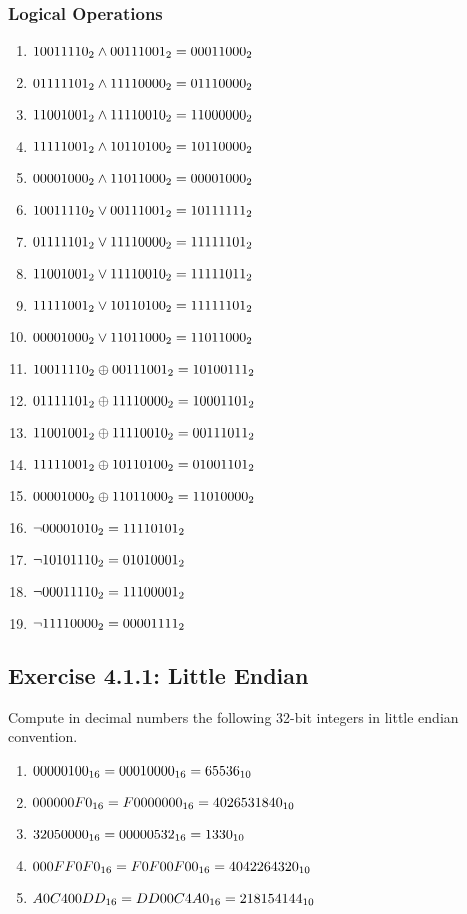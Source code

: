 \documentclass[12pt, a4paper, oneside]{article}
\begin{document}
\subsubsection{Logical Operations}
\begin{enumerate}[$\bullet$]
  \item $1001 1110_{2} \land 0011 1001_{2} \hfill = 0001 1000_{2}$
  \item $0111 1101_{2} \land 1111 0000_{2} \hfill = 0111 0000_{2}$
  \item $1100 1001_{2} \land 1111 0010_{2} \hfill = 1100 0000_{2}$
  \item $1111 1001_{2} \land 1011 0100_{2} \hfill = 1011 0000_{2}$
  \item $0000 1000_{2} \land 1101 1000_{2} \hfill = 0000 1000_{2}$
  \item $1001 1110_{2} \lor 0011 1001_{2} \hfill = 1011 1111_{2}$
  \item $0111 1101_{2} \lor 1111 0000_{2} \hfill = 1111 1101_{2}$
  \item $1100 1001_{2} \lor 1111 0010_{2} \hfill = 1111 1011_{2}$
  \item $1111 1001_{2} \lor 1011 0100_{2} \hfill = 1111 1101_{2}$
  \item $0000 1000_{2} \lor 1101 1000_{2} \hfill = 1101 1000_{2}$
  \item $1001 1110_{2} \oplus 0011 1001_{2} \hfill = 1010 0111_{2}$
  \item $0111 1101_{2} \oplus 1111 0000_{2} \hfill = 1000 1101_{2}$
  \item $1100 1001_{2} \oplus 1111 0010_{2} \hfill = 0011 1011_{2}$
  \item $1111 1001_{2} \oplus 1011 0100_{2} \hfill = 0100 1101_{2}$
  \item $0000 1000_{2} \oplus 1101 1000_{2} \hfill = 1101 0000_{2}$
  \item $\lnot 0000 1010_{2} \hfill = 1111 0101_{2}$
  \item $\lnot 1010 1110_{2} \hfill = 0101 0001_{2}$
  \item $\lnot 0001 1110_{2} \hfill = 1110 0001_{2}$
  \item $\lnot 1111 0000_{2} \hfill = 0000 1111_{2}$ 
\end{enumerate}
 
\subsection{Exercise 4.1.1: Little Endian}
Compute in decimal numbers the following 32-bit integers in little endian convention.
\begin{enumerate}[$\bullet$]
  \item $00 00 01 00_{16} \hfill = 00 01 00 00_{16} = 65536_{10}$
  \item $00 00 00 F0_{16} \hfill = F0 00 00 00_{16} = 4026531840_{10}$
  \item $32 05 00 00_{16} \hfill = 00 00 05 32_{16} = 1330_{10}$
  \item $00 0F F0 F0_{16} \hfill = F0 F0 0F 00_{16} = 4042264320_{10}$
  \item $A0 C4 00 DD_{16} \hfill = DD 00 C4 A0_{16} = 218154144_{10}$
\end{enumerate}
\end{document}
